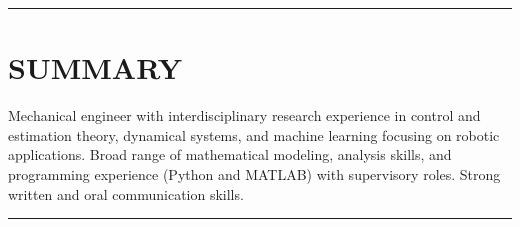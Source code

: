 \documentclass{res}
\begin{document}

 
\begin{resume}

%
%

 \vspace*{-2ex}
\hspace{-8.5ex}\rule{16.5cm}{0.4pt}
 \vspace*{-3ex}
\section{SUMMARY}
\vspace{1ex}
Mechanical engineer with interdisciplinary research experience in control and estimation theory, dynamical systems, and machine learning focusing on robotic applications.  Broad range of mathematical modeling, analysis skills, and programming experience (Python and MATLAB) with supervisory roles. Strong written and oral communication skills.

 \vspace*{-4ex}
\hspace{-8.5ex}\rule{16.5cm}{0.4pt}
 \vspace*{-3ex}

\end{resume}
\end{document}
